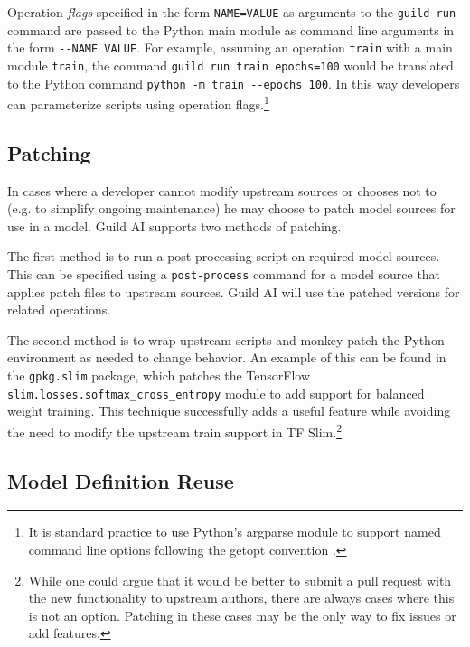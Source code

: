 \documentclass{article}
\begin{document}
Operation \emph{flags} specified in the form \verb|NAME=VALUE| as
arguments to the \verb|guild run| command are passed to the Python
main module as command line arguments in the form
\verb|--NAME VALUE|. For example, assuming an operation \verb|train|
with a main module \verb|train|, the command
\verb|guild run train epochs=100| would be translated to the Python
command \verb|python -m train --epochs 100|. In this way developers
can parameterize scripts using operation flags.\footnote{It is
  standard practice to use Python's argparse module to support named
  command line options following the getopt convention \cite{getopt}.}

\iffalse
If a flag name doesn't correspond to the option name expected
(e.g. the train script expected the option \verb|num_epochs|) the
developer can specify an alternative argument name for a flag using
the \verb|arg-name| attribute.
\fi

\subsection{Patching}
\label{sec:patching}

In cases where a developer cannot modify upstream sources or chooses
not to (e.g. to simplify ongoing maintenance) he may choose to patch
model sources for use in a model. Guild AI supports two methods of
patching.

The first method is to run a post processing script on required model
sources. This can be specified using a \verb|post-process| command for
a model source that applies patch files to upstream sources. Guild AI
will use the patched versions for related operations.

The second method is to wrap upstream scripts and monkey patch the
Python environment as needed to change behavior. An example of this
can be found in the \verb|gpkg.slim| package, which patches the
TensorFlow \verb|slim.losses.softmax_cross_entropy| module to add
support for balanced weight training. This technique successfully adds
a useful feature while avoiding the need to modify the upstream train
support in TF Slim.\footnote{While one could argue that it would be
  better to submit a pull request with the new functionality to
  upstream authors, there are always cases where this is not an
  option. Patching in these cases may be the only way to fix issues or
  add features.}

\subsection{Model Definition Reuse}
\end{document}

